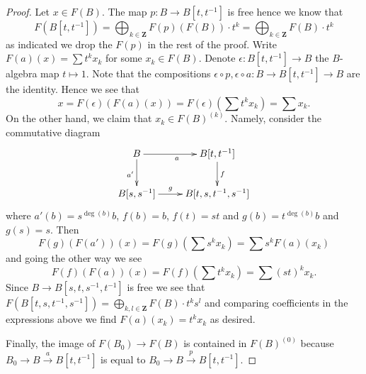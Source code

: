 \documentclass{stacks-project}
\theoremstyle{plain}
\theoremstyle{definition}
\theoremstyle{remark}
\numberwithin{equation}{subsection}
\begin{document}
\begin{proof}
Let $x \in F(B)$. The map $p : B \to B[t, t^{-1}]$ is free
hence we know that
$$
F(B[t, t^{-1}]) =
\bigoplus\nolimits_{k \in \mathbf{Z}} F(p)(F(B)) \cdot t^k =
\bigoplus\nolimits_{k \in \mathbf{Z}} F(B) \cdot t^k
$$
as indicated we drop the $F(p)$ in the rest of the proof.
Write $F(a)(x) = \sum t^k x_k$ for some $x_k \in F(B)$.
Denote $\epsilon : B[t, t^{-1}] \to B$
the $B$-algebra map $t \mapsto 1$. Note that the compositions
$\epsilon \circ p, \epsilon \circ a : B \to B[t, t^{-1}] \to B$ are
the identity. Hence we see that
$$
x = F(\epsilon)(F(a)(x)) = F(\epsilon)(\sum t^k x_k) = \sum x_k.
$$
On the other hand, we claim that $x_k \in F(B)^{(k)}$. Namely, consider
the commutative diagram
$$
\xymatrix{
B \ar[r]_a \ar[d]_{a'} &
B[t, t^{-1}] \ar[d]^f \\
B[s, s^{-1}] \ar[r]^-g &
B[t, s, t^{-1}, s^{-1}]
}
$$
where $a'(b) = s^{\deg(b)}b$, $f(b) = b$, $f(t) = st$ and
$g(b) = t^{\deg(b)}b$ and $g(s) = s$. Then
$$
F(g)(F(a'))(x) = F(g)(\sum s^k x_k) =
\sum s^k F(a)(x_k)
$$
and going the other way we see
$$
F(f)(F(a))(x) = F(f)(\sum t^k x_k) = \sum (st)^k x_k.
$$
Since $B \to B[s, t, s^{-1}, t^{-1}]$ is free we see that
$F(B[t, s, t^{-1}, s^{-1}]) =
\bigoplus_{k, l \in \mathbf{Z}} F(B) \cdot t^ks^l$ and
comparing coefficients in the expressions above we find
$F(a)(x_k) = t^k x_k$ as desired.

\medskip\noindent
Finally, the image of $F(B_0) \to F(B)$ is contained in $F(B)^{(0)}$
because $B_0 \to B \xrightarrow{a} B[t, t^{-1}]$ is equal to
$B_0 \to B \xrightarrow{p} B[t, t^{-1}]$.
\end{proof}
\end{document}
